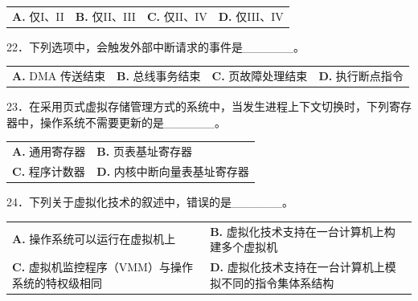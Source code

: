 \documentclass[UTF8,11pt]{ctexart}
\begin{document}
\begin{center}\begin{tabular}{>{\raggedright\arraybackslash}p{\dimexpr(\linewidth-8\tabcolsep)/4\relax}>{\raggedright\arraybackslash}p{\dimexpr(\linewidth-8\tabcolsep)/4\relax}>{\raggedright\arraybackslash}p{\dimexpr(\linewidth-8\tabcolsep)/4\relax}>{\raggedright\arraybackslash}p{\dimexpr(\linewidth-8\tabcolsep)/4\relax}}
\textbf{A.} 仅I、II & \textbf{B.} 仅II、III & \textbf{C.} 仅II、IV & \textbf{D.} 仅III、IV\\[.35em]\end{tabular}\end{center}

22．下列选项中，会触发外部中断请求的事件是\_\_\_\_\_\_。


\begin{center}\begin{tabular}{>{\raggedright\arraybackslash}p{\dimexpr(\linewidth-8\tabcolsep)/4\relax}>{\raggedright\arraybackslash}p{\dimexpr(\linewidth-8\tabcolsep)/4\relax}>{\raggedright\arraybackslash}p{\dimexpr(\linewidth-8\tabcolsep)/4\relax}>{\raggedright\arraybackslash}p{\dimexpr(\linewidth-8\tabcolsep)/4\relax}}
\textbf{A.} DMA 传送结束 & \textbf{B.} 总线事务结束 & \textbf{C.} 页故障处理结束 & \textbf{D.} 执行断点指令\\[.35em]\end{tabular}\end{center}

23．在采用页式虚拟存储管理方式的系统中，当发生进程上下文切换时，下列寄存器中，操作系统不需要更新的是\_\_\_\_\_\_。


\begin{center}\begin{tabular}{>{\raggedright\arraybackslash}p{\dimexpr(\linewidth-4\tabcolsep)/2\relax}>{\raggedright\arraybackslash}p{\dimexpr(\linewidth-4\tabcolsep)/2\relax}}
\textbf{A.} 通用寄存器 & \textbf{B.} 页表基址寄存器\\[.35em]
\textbf{C.} 程序计数器 & \textbf{D.} 内核中断向量表基址寄存器\\[.35em]\end{tabular}\end{center}

24．下列关于虚拟化技术的叙述中，错误的是\_\_\_\_\_\_。


\begin{center}\begin{tabular}{>{\raggedright\arraybackslash}p{\dimexpr(\linewidth-4\tabcolsep)/2\relax}>{\raggedright\arraybackslash}p{\dimexpr(\linewidth-4\tabcolsep)/2\relax}}
\textbf{A.} 操作系统可以运行在虚拟机上 & \textbf{B.} 虚拟化技术支持在一台计算机上构建多个虚拟机\\[.35em]
\textbf{C.} 虚拟机监控程序（VMM）与操作系统的特权级相同 & \textbf{D.} 虚拟化技术支持在一台计算机上模拟不同的指令集体系结构\\[.35em]\end{tabular}\end{center}
\end{document}

